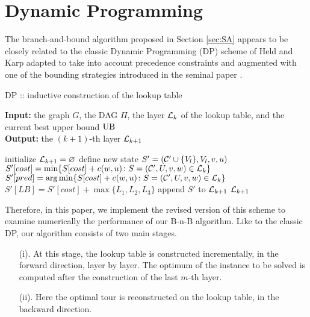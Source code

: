 \section{Dynamic Programming}\label{sec:DP}
The branch-and-bound algorithm proposed in Section \ref{sec:SA} appears to be closely related to the classic Dynamic Programming (DP) scheme of Held and Karp  \cite{HeldKarp1962} adapted to take into account precedence constraints and augmented with one of the bounding strategies introduced in the seminal paper \cite{MorinMarsten1976}.

\begin{algorithm}[t]
\caption{DP ::  inductive construction of the lookup table}\label{alg:A2}
\hspace*{\algorithmicindent}\textbf{Input:} the graph $G$, the DAG $\Pi$, the layer $\mathcal{L}_k$ of the lookup table, and the current best upper bound $\mathrm{UB}$\\
\hspace*{\algorithmicindent}\textbf{Output:} the $(k+1)$-th layer $\mathcal{L}_{k+1}$
\begin{algorithmic}[1]
\STATE initialize $\mathcal{L}_{k+1}=\varnothing$
      \STATE define new state $S'=(\mathcal{C}'\cup\{V_l\}, V_l, v, u)$
      \STATE $S'[cost] = \min\{S[cost] + c(w,u)\colon S=(\mathcal{C}',U,v,w)\in\mathcal{L}_k\}$
      \STATE $S'[pred] = \arg\min\{S[cost] + c(w,u)\colon S=(\mathcal{C}',U,v,w)\in\mathcal{L}_k\}$
      \STATE $S'[LB] = S'[cost] + \max\{L_1,L_2,L_3\}$
        \STATE append $S'$ to $\mathcal{L}_{k+1}$
      \ENDIF
    \ENDIF
    \ENDFOR
  \ENDFOR
\ENDFOR
\RETURN $\mathcal{L}_{k+1}$
\end{algorithmic}
\end{algorithm}

Therefore, in this paper, we implement the revised version of this scheme to examine numerically the performance of our B-n-B algorithm.
Like to the classic DP, our algorithm consists of two main stages.
\begin{itemize}
  \item[(i).] At this stage, the lookup table is constructed incrementally, in the forward direction, layer by layer. The optimum of the instance to be solved is computed after the construction of the last $m$-th layer.
  \item[(ii).] Here the optimal tour is reconstructed on the lookup table, in the backward direction.
\end{itemize}


